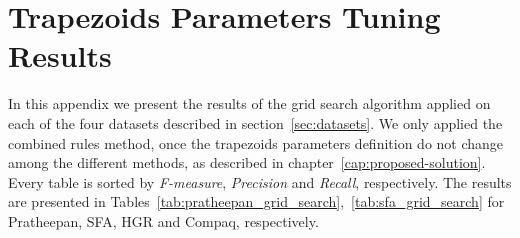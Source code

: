 \chapter{Trapezoids Parameters Tuning Results}
\label{ape:trapezoids_parameters_tuning}

In this appendix we present the results of the grid search algorithm applied on each of the four datasets described in section~\ref{sec:datasets}. We only applied the combined rules method, once the trapezoids parameters definition do not change among the different methods, as described in chapter~\ref{cap:proposed-solution}. Every table is sorted by \emph{F-measure}, \emph{Precision} and \emph{Recall}, respectively. The results are presented in Tables~\ref{tab:pratheepan_grid_search},~\ref{tab:sfa_grid_search} for Pratheepan, SFA, HGR and Compaq, respectively.


\singlespacing

